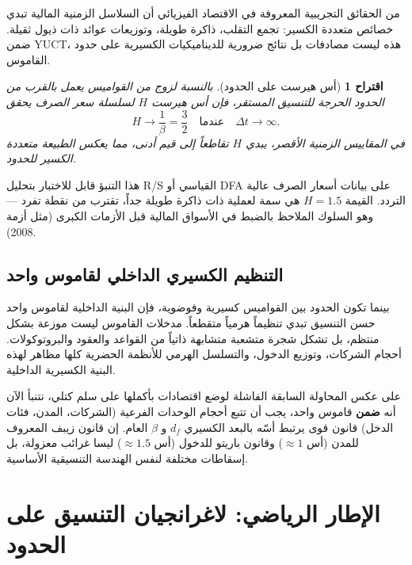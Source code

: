 \documentclass[12pt,a4paper]{article}
\newtheorem{proposition}[theorem]{اقتراح}
\theoremstyle{remark}
\begin{document}
	من الحقائق التجريبية المعروفة في الاقتصاد الفيزيائي أن السلاسل الزمنية المالية تبدي خصائص متعددة الكسير: تجمع التقلب، ذاكرة طويلة، وتوزيعات عوائد ذات ذيول ثقيلة. ضمن YUCT، هذه ليست مصادفات بل نتائج ضرورية للديناميكيات الكسيرية على حدود القاموس.
	
	\begin{proposition}[أس هيرست على الحدود]
		بالنسبة لزوج من القواميس يعمل بالقرب من الحدود الحرجة للتنسيق المستقر، فإن أس هيرست \(H\) لسلسلة سعر الصرف يحقق
		\begin{equation}
			H \to \frac{1}{\beta} = \frac{3}{2} \quad \text{عندما} \quad \Delta t \to \infty.
			\label{eq:hurst}
		\end{equation}
		في المقاييس الزمنية الأقصر، يبدي \(H\) تقاطعاً إلى قيم أدنى، مما يعكس الطبيعة متعددة الكسير للحدود.
	\end{proposition}
	
	هذا التنبؤ قابل للاختبار بتحليل R/S القياسي أو DFA على بيانات أسعار الصرف عالية التردد. القيمة \(H = 1.5\) هي سمة لعملية ذات ذاكرة طويلة جداً، تقترب من نقطة تفرد — وهو السلوك الملاحظ بالضبط في الأسواق المالية قبل الأزمات الكبرى (مثل أزمة 2008).
	
	\subsection{التنظيم الكسيري الداخلي لقاموس واحد}
	
	بينما تكون الحدود بين القواميس كسيرية وفوضوية، فإن البنية الداخلية لقاموس واحد حسن التنسيق تبدي تنظيماً هرمياً متقطعاً. مدخلات القاموس ليست موزعة بشكل منتظم، بل تشكل شجرة متشعبة متشابهة ذاتياً من القواعد والعقود والبروتوكولات. أحجام الشركات، وتوزيع الدخول، والتسلسل الهرمي للأنظمة الحضرية كلها مظاهر لهذه البنية الكسيرية الداخلية.
	
	على عكس المحاولة السابقة الفاشلة لوضع اقتصادات بأكملها على سلم كتلي، نتنبأ الآن أنه \textbf{ضمن} قاموس واحد، يجب أن تتبع أحجام الوحدات الفرعية (الشركات، المدن، فئات الدخل) قانون قوى يرتبط أسّه بالبعد الكسيري \(d_f\) و \(\beta\) العام. إن قانون زيبف المعروف للمدن (أس \(\approx 1\)) وقانون باريتو للدخول (أس \(\approx 1.5\)) ليسا غرائب معزولة، بل إسقاطات مختلفة لنفس الهندسة التنسيقية الأساسية.
	
	\section{الإطار الرياضي: لاغرانجيان التنسيق على الحدود}
	
\end{document}
